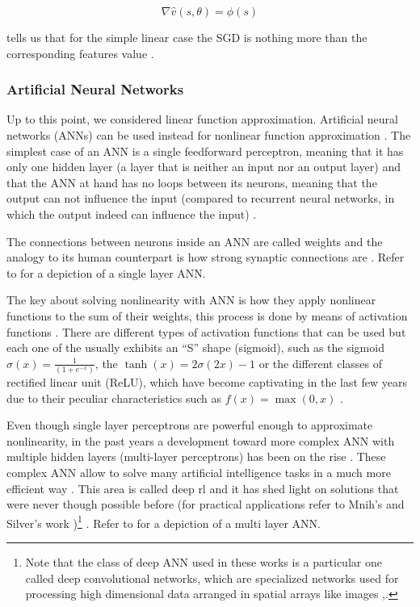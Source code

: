 \documentclass{seal_thesis}
\begin{document}
\begin{equation}
\label{eq:sgd_linear}
	\nabla \hat{v} (s,\theta) = \phi (s)
\end{equation}

 tells us that for the simple linear case the SGD is nothing more than the corresponding features value  \cite[p. 199]{Sutton2017}.

\subsubsection{Artificial Neural Networks}

Up to this point, we considered linear function approximation. Artificial neural networks (ANNs) can be used instead for nonlinear function approximation \cite[p. 199]{Sutton2017}. The simplest case of an ANN is a single feedforward perceptron, meaning that it has only one hidden layer (\ie a layer that is neither an input nor an output layer) and that the ANN at hand has no loops between its neurons, meaning that the output can not influence the input (compared to recurrent neural networks, in which the output indeed can influence the input) \cite[p. 216]{Sutton2017}. 

The connections between neurons inside an ANN are called weights and the analogy to its human counterpart is how strong synaptic connections are \cite[p. 216]{Sutton2017}. Refer to  for a depiction of a single layer ANN.

The key about solving nonlinearity with ANN is how they apply nonlinear functions to the sum of their weights, this process is done by means of activation functions \cite[p. 216]{Sutton2017}. There are different types of activation functions that can be used but each one of the usually exhibits an ``S'' shape (\ie sigmoid), such as the sigmoid $\sigma(x) = \frac{1}{(1+e^{-x})}$, the $\tanh(x) = 2\sigma(2x)-1$ or the different classes of rectified linear unit (ReLU), which have become captivating in the last few years due to their peculiar characteristics such as $f(x) = \max(0,x)$ \cite[p. 216]{Sutton2017}.


Even though single layer perceptrons are powerful enough to approximate nonlinearity, in the past years a development toward more complex ANN with multiple hidden layers (\ie multi-layer perceptrons) has been on the rise \cite[p. 217]{Sutton2017}. These complex ANN allow to solve many artificial intelligence tasks in a much more efficient way \cite{Bengio2009}. This area is called deep \gls{rl} and it has shed light on solutions that were never though possible before (for practical applications refer to Mnih's \cite{Mnih2015} and Silver's work \cite{Silver2016})\footnote{Note that the class of deep ANN used in these works is a particular one called deep convolutional networks, which are specialized networks used for processing high dimensional data arranged in spatial arrays like images \cite[p. 219]{Sutton2017},\cite{Lecun1998}.} \cite{Bengio2009}. Refer to  for a depiction of a multi layer ANN.
\end{document}
